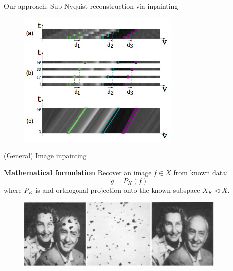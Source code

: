 \begin{frame}{Our approach: Sub-Nyquist reconstruction via inpainting}

\begin{figure}[h!]
\includegraphics[width=0.7\textwidth]{./images/sparse_EPI.jpg}
\end{figure}

\end{frame}

\begin{frame}{(General) Image inpainting}
\begin{block}{\textbf{Mathematical formulation}}
 Recover an image $f\in X$ from known data:
$$
g = P_K(f)
$$
where $P_K$ is and orthogonal projection onto the known subspace $X_K\triangleleft X$.
\end{block}

\begin{figure}[h!]
\centering
\includegraphics[width=0.9\textwidth]{./images/inpaint.jpg}
\end{figure}

\end{frame}


